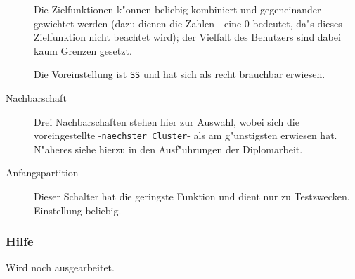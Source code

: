 \begin{description}
	Die Zielfunktionen k"onnen beliebig kombiniert und gegeneinander
	gewichtet werden (dazu dienen die Zahlen - eine 0 bedeutet, 
	da"s dieses Zielfunktion nicht beachtet wird); der Vielfalt
	des Benutzers sind dabei kaum Grenzen gesetzt.

	Die Voreinstellung ist \verb-SS- und hat sich als recht brauchbar
	erwiesen.

\item[Nachbarschaft] Drei Nachbarschaften stehen hier zur Auswahl, wobei
	sich die voreingestellte -\verb-naechster Cluster-- als am 
	g"unstigsten erwiesen hat. N"aheres siehe hierzu in den Ausf"uhrungen
	der Diplomarbeit.
\item[Anfangspartition] Dieser Schalter hat die geringste Funktion und dient
	nur zu Testzwecken. Einstellung beliebig.
\end{description}



\subsubsection{Hilfe}

Wird noch ausgearbeitet.

